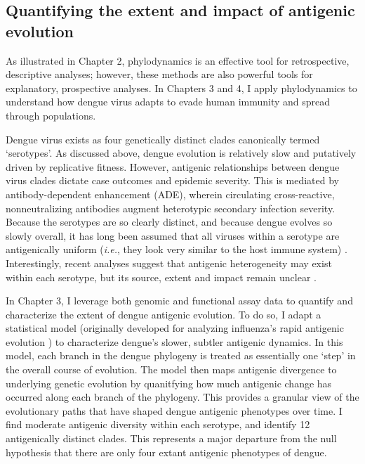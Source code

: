 \subsection{Quantifying the extent and impact of antigenic evolution}
As illustrated in Chapter 2, phylodynamics is an effective tool for retrospective, descriptive analyses; however, these methods are also powerful tools for explanatory, prospective analyses.
In Chapters 3 and 4, I apply phylodynamics to understand how dengue virus adapts to evade human immunity and spread through populations.

Dengue virus exists as four genetically distinct clades canonically termed `serotypes'.
As discussed above, dengue evolution is relatively slow and putatively driven by replicative fitness.
However, antigenic relationships between dengue virus clades dictate case outcomes and epidemic severity.
This is mediated by antibody-dependent enhancement (ADE), wherein circulating cross-reactive, nonneutralizing antibodies augment heterotypic secondary infection severity.
Because the serotypes are so clearly distinct, and because dengue evolves so slowly overall, it has long been assumed that all viruses within a serotype are antigenically uniform (\textit{i.e.}, they look very similar to the host immune system) \citep{twiddy2003inferring}.
Interestingly, recent analyses suggest that antigenic heterogeneity may exist within each serotype, but its source, extent and impact remain unclear \citep{katzelnick2015dengue}.

In Chapter 3, I leverage both genomic and functional assay data to quantify and characterize the extent of dengue antigenic evolution.
To do so, I adapt a statistical model (originally developed for analyzing influenza's rapid antigenic evolution \citep{neher2016prediction}) to characterize dengue's slower, subtler antigenic dynamics.
In this model, each branch in the dengue phylogeny is treated as essentially one `step' in the overall course of evolution.
The model then maps antigenic divergence to underlying genetic evolution by quanitfying how much antigenic change has occurred along each branch of the phylogeny.
This provides a granular view of the evolutionary paths that have shaped dengue antigenic phenotypes over time.
I find moderate antigenic diversity within each serotype, and identify 12 antigenically distinct clades.
This represents a major departure from the null hypothesis that there are only four extant antigenic phenotypes of dengue.

